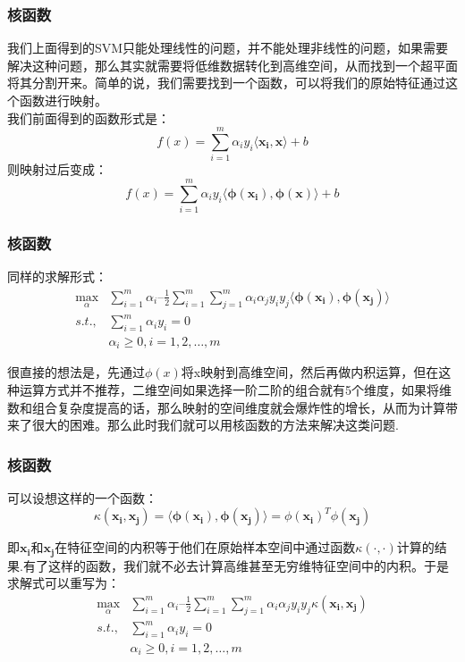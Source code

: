 \begin{frame}

\frametitle{核函数}

    我们上面得到的SVM只能处理线性的问题，并不能处理非线性的问题，如果需要解决这种问题，那么其实就需要将低维数据转化到高维空间，从而找到一个超平面将其分割开来。简单的说，我们需要找到一个函数，可以将我们的原始特征通过这个函数进行映射。\\
    我们前面得到的函数形式是：
 \[
 f(x)= \sum_{i=1}^m\alpha_i y_i \langle\boldsymbol{x_i, x}\rangle + b
 \]
 则映射过后变成：  
  \[
 f(x)= \sum_{i=1}^m\alpha_i y_i \langle\boldsymbol{\phi(x_i),\phi(x)}\rangle + b
 \]

\end{frame}


\begin{frame}

\frametitle{核函数}

同样的求解形式：
\begin{align*}
 \max_\alpha &\sum_{i=1}^m\alpha_i – \frac{1}{2}\sum_{i=1}^m\sum_{j=1}^m\alpha_i\alpha_jy_iy_j\langle\boldsymbol{\phi(x_i)},\boldsymbol{\phi(x_j)}\rangle \\ 
 s.t.,&\sum_{i=1}^m\alpha_iy_i = 0 \\
  &\alpha_i\geq 0, i=1,2,\ldots,m
 \end{align*}

 很直接的想法是，先通过$\phi(x)$将x映射到高维空间，然后再做内积运算，但在这种运算方式并不推荐，二维空间如果选择一阶二阶的组合就有5个维度，如果将维数和组合复杂度提高的话，那么映射的空间维度就会爆炸性的增长，从而为计算带来了很大的困难。那么此时我们就可以用核函数的方法来解决这类问题.
\end{frame}


\begin{frame}

\frametitle{核函数}

可以设想这样的一个函数：
\[
\kappa(\boldsymbol{x_i,x_j})=\langle\boldsymbol{\phi(x_i),\phi(x_j)}\rangle = \phi(\boldsymbol{x_i})^T\phi(\boldsymbol{x_j})
\]

即$\boldsymbol{x_i}$和$\boldsymbol{x_j}$在特征空间的内积等于他们在原始样本空间中通过函数$\kappa(\cdot,\cdot)$计算的结果.有了这样的函数，我们就不必去计算高维甚至无穷维特征空间中的内积。于是求解式可以重写为：
\begin{align*}
 \max_\alpha &\sum_{i=1}^m\alpha_i – \frac{1}{2}\sum_{i=1}^m\sum_{j=1}^m\alpha_i\alpha_jy_iy_j\kappa(\boldsymbol{x_i,x_j}) \\ 
 s.t.,&\sum_{i=1}^m\alpha_iy_i = 0 \\
  &\alpha_i\geq 0, i=1,2,\ldots,m
 \end{align*}
\end{frame}



